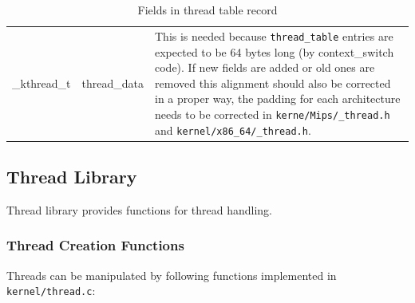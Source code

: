 \documentclass[twoside,a4paper]{report}
\newcommand{\PBS}[1]{\let\temp=\\#1\let\\=\temp}
\newlength{\tablewidth}
\begin{document}
\begin{table}
\begin{center}
\begin{tabularx}{\tablewidth}{l|l|>{\PBS\raggedright}X}
\hline

\_kthread\_t & thread\_data & This is needed because
\texttt{thread\_table} entries are expected to be 64 bytes long (by
context\_switch code). If new fields are added or old ones are removed
this alignment should also be corrected in a proper way, the padding for each
architecture needs to be corrected  in \texttt{kerne/Mips/\_thread.h}
and \texttt{kernel/x86\_64/\_thread.h}.

\end{tabularx}
\end{center}
\caption{Fields in thread table record}
\label{tab:threadtable}
\end{table}


\subsection{Thread Library}
\label{sec:threadlib}


Thread library provides functions for thread handling.

\subsubsection{Thread Creation Functions}


Threads can be manipulated by following functions implemented in
\texttt{kernel/thread.c}:
\end{document}

